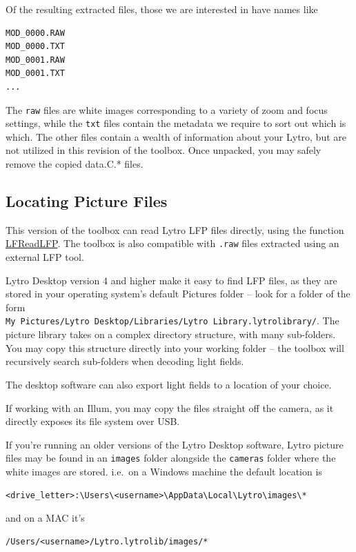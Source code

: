 \documentclass[onecolumn]{article}
\newcommand{\CiteFunction}[1]{\hyperlink{#1}{\small #1}}
\newcommand{\SymbolText}[1]{\texttt{\small #1}}
\begin{document}
\begin{appendices}
Of the resulting extracted files, those we are interested in have names like
\begin{Verbatim} 
MOD_0000.RAW
MOD_0000.TXT
MOD_0001.RAW
MOD_0001.TXT
...
\end{Verbatim}

The \SymbolText{raw} files are white images corresponding to a variety of zoom and focus settings, while the \SymbolText{txt} files contain the metadata we require to sort out which is which. The other files contain a wealth of information about your Lytro, but are not utilized in this revision of the toolbox.  Once unpacked, you may safely remove the copied data.C.* files.

\subsection{Locating Picture Files}
\label{sect_LytroFiles_Pict}

This version of the toolbox can read Lytro LFP files directly, using the function \CiteFunction{LFReadLFP}.  The toolbox is also compatible with \SymbolText{.raw} files extracted using an external LFP tool.

Lytro Desktop version 4 and higher make it easy to find LFP files, as they are stored in your operating system's default Pictures folder -- look for a folder of the form\\ \SymbolText{My Pictures/Lytro Desktop/Libraries/Lytro Library.lytrolibrary/}.  The picture library takes on a complex directory structure, with many sub-folders.  You may copy this structure directly into your working folder -- the toolbox will recursively search sub-folders when decoding light fields.  

The desktop software can also export light fields to a location of your choice.

If working with an Illum, you may copy the files straight off the camera, as it directly exposes its file system over USB.

If you're running an older versions of the Lytro Desktop software, Lytro picture files may be found in an \SymbolText{images} folder alongside the \SymbolText{cameras} folder where the white images are stored. i.e.\  on a Windows machine the default location is
\begin{Verbatim} 
<drive_letter>:\Users\<username>\AppData\Local\Lytro\images\*
\end{Verbatim}

and on a MAC it's
\begin{Verbatim} 
/Users/<username>/Lytro.lytrolib/images/*
\end{Verbatim}


\end{appendices}
\end{document}
